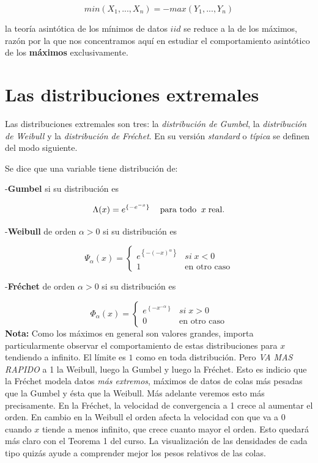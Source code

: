 \documentclass[
]{book}
\theoremstyle{definition}
\theoremstyle{definition}
\theoremstyle{definition}
\theoremstyle{definition}
\theoremstyle{remark}
\begin{document}
\begin{equation}
min(X_1,...,X_n) = - max(Y_1,...,Y_n)
\end{equation}

la teoría asintótica de los mínimos de datos \(iid\)
se reduce a la de los máximos, razón por la que
nos concentramos aquí en estudiar el
comportamiento asintótico de los \textbf{máximos}
exclusivamente.

\section{Las distribuciones extremales}\label{las-distribuciones-extremales}

Las distribuciones extremales son tres: la
\emph{distribución de Gumbel}, la \emph{distribución de Weibull} y
la \emph{distribución de Fréchet}. En su versión \emph{standard} o \emph{típica} se definen del modo
siguiente.

Se dice que una variable tiene distribución de:

-\textbf{Gumbel} si su distribución es

\[\Lambda(x) = e^{\{-e^{-x}\}}\hspace{0.3cm}\text{ para todo }\: x \;\text{real}.\]

-\textbf{Weibull} de orden \(\alpha>0\) si su distribución es

\[\Psi_{\alpha}(x)=\begin{cases}
e^{\left\{-(-x)^{\alpha}  \right\}} & si\;x<0\\
1 & \text{en otro caso}
\end{cases}\]

-\textbf{Fréchet} de orden \(\alpha>0\) si su distribución es

\[
\Phi_{\alpha}(x)=\begin{cases}
e^{\left\{ -x^{-\alpha}\right\}} & si\;x>0\\
0 & \text{en otro caso}
\end{cases}
\]
\textbf{Nota:} Como los máximos en general son valores grandes,
importa particularmente observar el comportamiento de estas distribuciones para \(x\) tendiendo a infinito. El límite es \(1\) como en toda distribución. Pero \emph{VA MAS RAPIDO} a 1 la Weibull, luego la Gumbel y luego la Fréchet. Esto es indicio que la
Fréchet modela datos \emph{más extremos}, máximos de datos de
colas más pesadas que la Gumbel y ésta que la Weibull. Más
adelante veremos esto más precisamente. En la Fréchet, la
velocidad de convergencia a 1 crece al aumentar el orden. En cambio en la Weibull el orden afecta la velocidad con que va a 0 cuando \(x\) tiende a menos infinito, que crece cuanto mayor el orden. Esto quedará más claro con el Teorema 1 del curso. La visualización de las densidades de cada tipo quizás ayude a comprender mejor los pesos relativos de las colas.
\end{document}
